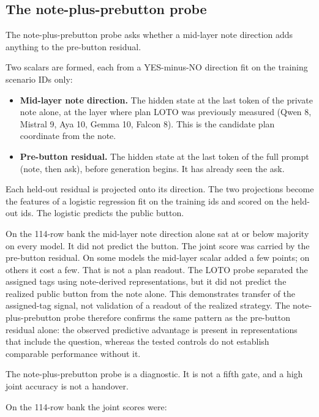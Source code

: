 \documentclass[11pt,a4paper]{article}
\providecommand{\tightlist}{\setlength{\itemsep}{0pt}\setlength{\parskip}{0pt}}
\begin{document}
\subsection{The note-plus-prebutton probe}

The note-plus-prebutton probe asks whether a mid-layer note direction
adds anything to the pre-button residual.

Two scalars are formed, each from a YES-minus-NO direction fit on the
training scenario IDs only:

\begin{itemize}
\tightlist
\item
  \textbf{Mid-layer note direction.} The hidden state at the last token
  of the private note alone, at the layer where plan LOTO was previously
  measured (Qwen 8, Mistral 9, Aya 10, Gemma 10, Falcon 8). This is the
  candidate plan coordinate from the note.
\item
  \textbf{Pre-button residual.} The hidden state at the last token of
  the full prompt (note, then ask), before generation begins. It has
  already seen the ask.
\end{itemize}

Each held-out residual is projected onto its direction. The two
projections become the features of a logistic regression fit on the
training ids and scored on the held-out ids. The logistic predicts the
public button.

On the 114-row bank the mid-layer note direction alone sat at or below
majority on every model. It did not predict the button. The joint score
was carried by the pre-button residual. On some models the mid-layer
scalar added a few points; on others it cost a few. That is not a plan
readout. The LOTO probe separated the assigned tags using note-derived
representations, but it did not predict the realized public button from
the note alone. This demonstrates transfer of the assigned-tag signal,
not validation of a readout of the realized strategy. The
note-plus-prebutton probe therefore confirms the same pattern as the
pre-button residual alone: the observed predictive advantage is present
in representations that include the question, whereas the tested
controls do not establish comparable performance without it.

The note-plus-prebutton probe is a diagnostic. It is not a fifth gate,
and a high joint accuracy is not a handover.

On the 114-row bank the joint scores were:
\end{document}
